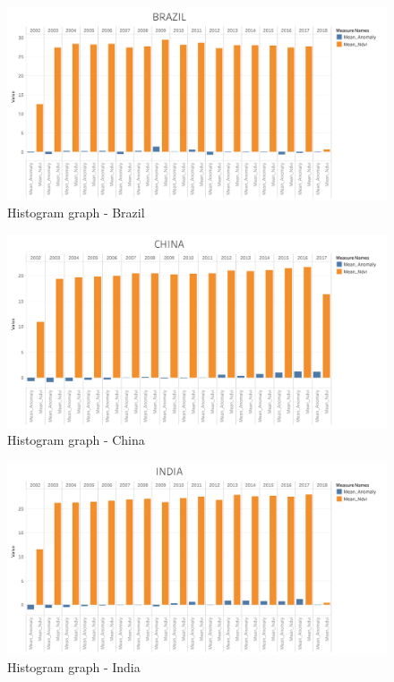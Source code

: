 \begin{itemize}
    \begin{figure}[H]
            \centering
            \includegraphics[width=1.0\linewidth]{figures/ch5/Histograms/BRAZIL_histogram.png}
            \caption{Histogram graph - Brazil}\label{Fig:BRAZIL_histogram}
    \end{figure}
    
    \begin{figure}[H]
            \centering
            \includegraphics[width=1.0\linewidth]{figures/ch5/Histograms/CHINA_histogram.png}
            \caption{Histogram graph - China}\label{Fig:CHINA_histogram}
    \end{figure}
    
    
    \begin{figure}[H]
            \centering
            \includegraphics[width=1.0\linewidth]{figures/ch5/Histograms/INDIA_histogram.png}
            \caption{Histogram graph - India}\label{Fig:INDIA_histogram}
    \end{figure}
    

\end{itemize}
